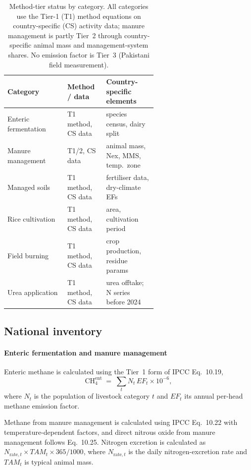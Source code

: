 \begin{table}[!htbp]
\centering
\footnotesize
\setlength{\tabcolsep}{4pt}
\begin{tabular}{@{}lp{0.26\linewidth}p{0.34\linewidth}@{}}
\toprule
\textbf{Category} & \textbf{Method / data} & \textbf{Country-specific elements} \\
\midrule
Enteric fermentation & T1 method, CS data & species census, dairy split \\
Manure management & T1/2, CS data & animal mass, Nex, MMS, temp.\ zone \\
Managed soils & T1 method, CS data & fertiliser data, dry-climate EFs \\
Rice cultivation & T1 method, CS data & area, cultivation period \\
Field burning & T1 method, CS data & crop production, residue params \\
Urea application & T1 method, CS data & urea offtake; N series before 2024 \\
\bottomrule
\end{tabular}
\caption{Method-tier status by category. All categories use the Tier-1 (T1)
method equations on country-specific (CS) activity data; manure management is
partly Tier~2 through country-specific animal mass and management-system shares.
No emission factor is Tier~3 (Pakistani field measurement).}
\label{tab:tierstatus}
\end{table}

\subsection{National inventory}

\paragraph{Enteric fermentation and manure management}
Enteric methane is calculated using the Tier~1 form of IPCC Eq.~10.19,
\begin{equation}
\mathrm{CH_4^{ent}} \;=\; \sum_t N_t\, EF_t \times 10^{-6},
\end{equation}
where $N_t$ is the population of livestock category $t$ and $EF_t$ its annual per-head
methane emission factor.

Methane from manure management is calculated using IPCC Eq.~10.22 with temperature-dependent
factors, and direct nitrous oxide from manure management follows Eq.~10.25. Nitrogen
excretion is calculated as $N_{\mathrm{rate},t} \times TAM_t \times 365/1000$, where
$N_{\mathrm{rate},t}$ is the daily nitrogen-excretion rate and $TAM_t$ is typical animal
mass.

